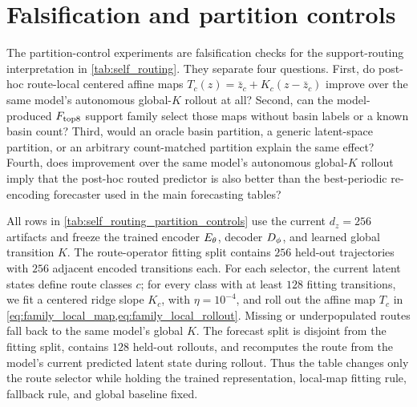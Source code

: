\section{Falsification and partition controls}
\label{app:falsification}

The partition-control experiments are falsification checks for the support-routing interpretation in \cref{tab:self_routing}. They separate four questions. First, do post-hoc route-local centered affine maps \(T_c(z)=\bar z_c+K_c(z-\bar z_c)\) improve over the same model's autonomous global-\(K\) rollout at all? Second, can the model-produced \(F_{\rm top8}\) support family select those maps without basin labels or a known basin count? Third, would an oracle basin partition, a generic latent-space partition, or an arbitrary count-matched partition explain the same effect? Fourth, does improvement over the same model's autonomous global-\(K\) rollout imply that the post-hoc routed predictor is also better than the best-periodic re-encoding forecaster used in the main forecasting tables?

All rows in \cref{tab:self_routing_partition_controls} use the current \(d_z=256\) artifacts and freeze the trained encoder \(E_\theta\), decoder \(D_\phi\), and learned global transition \(K\). The route-operator fitting split contains \(256\) held-out trajectories with \(256\) adjacent encoded transitions each. For each selector, the current latent states define route classes \(c\); for every class with at least \(128\) fitting transitions, we fit a centered ridge slope \(K_c\), with \(\eta=10^{-4}\), and roll out the affine map \(T_c\) in \cref{eq:family_local_map,eq:family_local_rollout}. Missing or underpopulated routes fall back to the same model's global \(K\). The forecast split is disjoint from the fitting split, contains \(128\) held-out rollouts, and recomputes the route from the model's current predicted latent state during rollout. Thus the table changes only the route selector while holding the trained representation, local-map fitting rule, fallback rule, and global baseline fixed.

